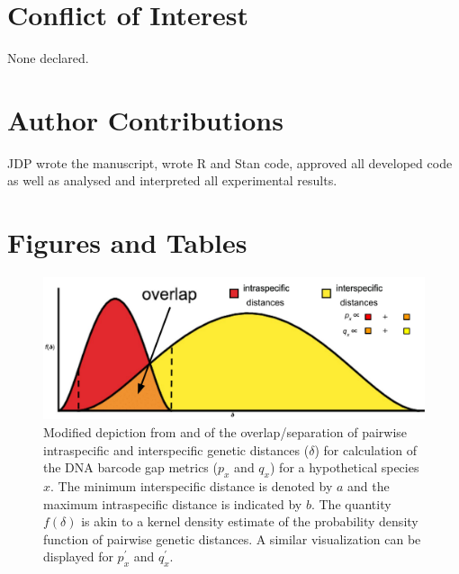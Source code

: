 \documentclass[12pt]{article}
\begin{document}
\section*{Conflict of Interest}

None declared.

\section*{Author Contributions}

JDP wrote the manuscript, wrote R and Stan code, approved all developed code as well as analysed and interpreted all experimental results. 




\section*{Figures and Tables}

\begin{figure}[H]

\centering

\includegraphics[width=1.0\textwidth]{Figure 1}

\caption{Modified depiction from \citet{meyer2005dna} and \citet{phillips2024measure} of the overlap/separation of pairwise intraspecific and interspecific genetic distances ($\delta$) for calculation of the DNA barcode gap metrics ($p_x$ and $q_x$) for a hypothetical species $x$. The minimum interspecific distance is denoted by $a$ and the maximum intraspecific distance is indicated by $b$. The quantity $f(\delta)$ is akin to a kernel density estimate of the probability density function of pairwise genetic distances. A similar visualization can be displayed for $p^{'}_x$ and $q^{'}_x$.}

\end{figure}
\end{document}
